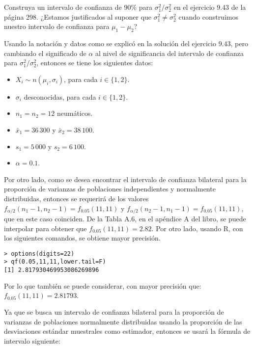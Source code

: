 \begin{enunciado}
 Construya un intervalo de confianza de $90\%$ para $\sigma_1^2/\sigma_2^2$ en el ejercicio 9.43 de la p\'agina 298. ¿Estamos justificados al suponer que $\sigma_1^2 \neq \sigma_2^2$ cuando construimos nuestro intervalo de confianza para $\mu_1 - \mu_2$?
\end{enunciado}

\begin{solucion}
 Usando la notaci\'on y datos como se explic\'o en la soluci\'on del ejercicio 9.43, pero cambiando el significado de $\alpha$ al nivel de significancia del intervalo de confianza para $\sigma_1^2/\sigma_2^2$, entonces se tiene los siguientes datos:
 \begin{itemize}
  \item $X_i \sim n\left( \mu_i, \sigma_i \right)$, para cada $i \in \{ 1, 2 \}$.
  \item $\sigma_i$ desconocidas, para cada $i \in \{ 1, 2 \}$.
  \item $n_1 = n_2 = 12$ neum\'aticos.
  \item $\bar{x}_1 = 36\,300$ y $\bar{x}_2 = 38\,100$.
  \item $s_1 = 5\,000$ y $s_2 = 6\,100$.
  \item $\alpha = 0.1$.
 \end{itemize}
 Por otro lado, como se desea encontrar el intervalo de confianza bilateral para la proporci\'on de varianzas de poblaciones independientes y normalmente distribuidas, entonces se requerir\'a de los valores $f_{\alpha/2}(n_1 - 1, n_2-1) = f_{0.05}(11,11)$ y $f_{\alpha/2}(n_2-1,n_1-1) = f_{0.05}(11,11)$, que en este caso coinciden. De la Tabla A.6, en el ap\'endice A del libro, se puede interpolar para obtener que $f_{0.05}(11,11) = 2.82$. Por otro lado, usando R, con los siguientes comandos, se obtiene mayor precisi\'on.
 \begin{verbatim}
> options(digits=22)
> qf(0.05,11,11,lower.tail=F)
[1] 2.817930469953086269896
 \end{verbatim}
 \vspace{-0.5cm}
 Por lo que tambi\'en se puede considerar, con mayor precisi\'on que: $f_{0.05}(11,11) = 2.81793$.
 \par 
 Ya que se busca un intervalo de confianza bilateral para la proporci\'on de varianzas de poblaciones normalmente distribuidas usando la proporci\'on de las desviaciones est\'andar muestrales como estimador, entonces se usar\'a la f\'ormula de intervalo siguiente:
 \begin{equation*}

\end{equation*}
\end{solucion}
